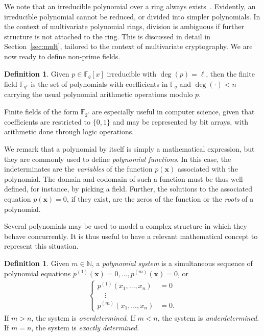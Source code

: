 \documentclass[draft, 12pt, a4paper, oneside]{memoir}
\theoremstyle{definition}
\newtheorem{definition}[theorem]{Definition}
\begin{document}
We note that an irreducible polynomial over a ring always exists~\cite[Remark 2.1.25]{Mullen:2013}. Evidently, an irreducible polynomial cannot be reduced, or divided into simpler polynomials. In the context of multivariate polynomial rings, division is ambiguous if further structure is not attached to the ring. This is discussed in detail in Section~\ref{sec:mult}, tailored to the context of multivariate cryptography. We are now ready to define non-prime fields.

\begin{definition}
  Given $p \in \mathbb{F}_{q}[x]$ irreducible with $\deg(p) = \ell$, then the finite field $\mathbb{F}_{q^{\ell}}$ is the set of polynomials with coefficients in $\mathbb{F}_{q}$ and $\deg(\cdot) < n$ carrying the usual polynomial arithmetic operations modulo $p$.
\end{definition}

Finite fields of the form $\mathbb{F}_{2^{\ell}}$ are especially useful in computer science, given that coefficients are restricted to $\{0, 1\}$ and may be represented by bit arrays, with arithmetic done through logic operations.

We remark that a polynomial by itself is simply a mathematical expression, but they are commonly used to define \emph{polynomial functions}. In this case, the indeterminates are the \emph{variables} of the function $p(\mathbf{x})$ associated with the polynomial. The domain and codomain of such a function must be thus well-defined, for instance, by picking a field. Further, the solutions to the associated equation $p(\mathbf{x}) = 0$, if they exist, are the zeros of the function or the \emph{roots} of a polynomial. 

Several polynomials may be used to model a complex structure in which they behave concurrently. It is thus useful to have a relevant mathematical concept to represent this situation.

\begin{definition}\label{def:polsys}
  Given $m \in \mathbb{N}$, a \emph{polynomial system} is a simultaneous sequence of polynomial equations $p^{(1)}(\mathbf{x}) = 0, \dots, p^{(m)}(\mathbf{x}) = 0$, or
  \begin{align*}
    \begin{cases}
      p^{(1)}(x_{1}, \dots, x_{n}) &= 0 \\
      \quad \vdots \\
      p^{(m)}(x_{1}, \dots, x_{n}) &= 0.
    \end{cases}
  \end{align*}
  If $m > n$, the system is \emph{overdetermined}. If $m < n$, the system is \emph{underdetermined}. If $m = n$, the system is \emph{exactly determined}.
\end{definition}
\end{document}
